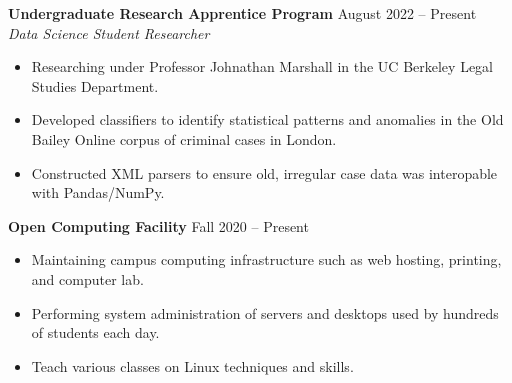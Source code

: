 \documentclass{article}
\begin{document}
\begin{adjustwidth}{1em}{1em}


    \textbf{Undergraduate Research Apprentice Program} \hfill August 2022 -- Present
    \\ \textit{Data Science Student Researcher}
    \begin{itemize}
        \item Researching under Professor Johnathan Marshall in the UC Berkeley Legal Studies Department.
        \item Developed classifiers to identify statistical patterns and anomalies in the Old Bailey Online corpus of criminal cases in London.
        \item Constructed XML parsers to ensure old, irregular case data was interopable with Pandas/NumPy.
    \end{itemize}

    \vspace{1mm}


    \textbf{Open Computing Facility} \hfill Fall 2020 -- Present
    \begin{itemize}
        \item Maintaining campus computing infrastructure such as web hosting, printing, and computer lab.
        \item Performing system administration of servers and desktops used by hundreds of students each day.
        \item Teach various classes on Linux techniques and skills.
    \end{itemize}


\end{adjustwidth}
\end{document}
